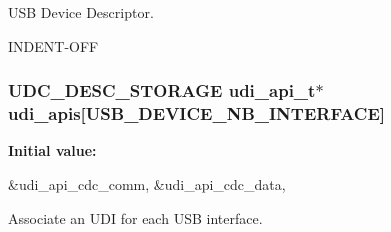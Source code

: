 \-U\-S\-B \-Device \-Descriptor. 

\-I\-N\-D\-E\-N\-T-\/\-O\-F\-F \hypertarget{group__udi__cdc__group__desc_ga5356b021bc068e4b564577e38b44ba0e}{
\subsubsection[{udi\-\_\-apis}]{\setlength{\rightskip}{0pt plus 5cm}\-U\-D\-C\-\_\-\-D\-E\-S\-C\-\_\-\-S\-T\-O\-R\-A\-G\-E {\bf udi\-\_\-api\-\_\-t}$\ast$ {\bf udi\-\_\-apis}\mbox{[}\-U\-S\-B\-\_\-\-D\-E\-V\-I\-C\-E\-\_\-\-N\-B\-\_\-\-I\-N\-T\-E\-R\-F\-A\-C\-E\mbox{]}}}
\label{group__udi__cdc__group__desc_ga5356b021bc068e4b564577e38b44ba0e}
{\bfseries \-Initial value\-:}
\begin{DoxyCode}
 {
        &udi_api_cdc_comm,
        &udi_api_cdc_data,
}
\end{DoxyCode}


\-Associate an \-U\-D\-I for each \-U\-S\-B interface. 


